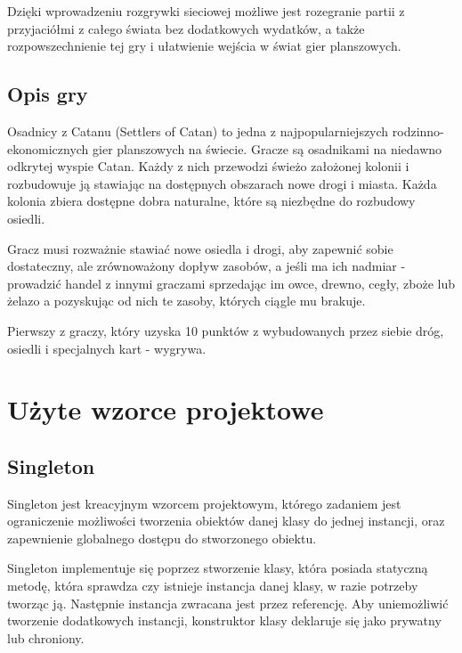 \documentclass[a4paper, 11pt]{article}
\begin{document}
	Dzięki wprowadzeniu rozgrywki sieciowej możliwe jest rozegranie partii z przyjaciółmi z całego świata bez dodatkowych wydatków, a także rozpowszechnienie tej gry i ułatwienie wejścia w świat gier planszowych. 
	\subsection{Opis gry}
	\indent
	
	Osadnicy z Catanu (Settlers of Catan) to jedna z najpopularniejszych rodzinno-ekonomicznych gier planszowych na świecie. 
	Gracze są osadnikami na niedawno odkrytej wyspie Catan. Każdy z nich przewodzi świeżo założonej kolonii i rozbudowuje ją stawiając na dostępnych obszarach nowe drogi i miasta. Każda kolonia zbiera dostępne dobra naturalne, które są niezbędne do rozbudowy osiedli.
	
	Gracz musi rozważnie stawiać nowe osiedla i drogi, aby zapewnić sobie dostateczny, ale zrównoważony dopływ zasobów, a jeśli ma ich nadmiar - prowadzić handel z innymi graczami sprzedając im owce, drewno, cegły, zboże lub żelazo a pozyskując od nich te zasoby, których ciągle mu brakuje.
	
	Pierwszy z graczy, który uzyska 10 punktów z wybudowanych przez siebie dróg, osiedli i specjalnych kart - wygrywa.
	
	
	
	
	
	
	
	\section{Użyte wzorce projektowe}
	\subsection{Singleton}
	\indent
	
	Singleton jest kreacyjnym wzorcem projektowym, którego zadaniem jest ograniczenie możliwości tworzenia obiektów danej klasy do jednej instancji, oraz zapewnienie globalnego dostępu do stworzonego obiektu.
	
	Singleton implementuje się poprzez stworzenie klasy, która posiada statyczną metodę, która sprawdza czy istnieje instancja danej klasy, w razie potrzeby tworząc ją. Następnie instancja zwracana jest przez referencję. Aby uniemożliwić tworzenie dodatkowych instancji, konstruktor klasy deklaruje się jako prywatny lub chroniony.
	
\end{document}

